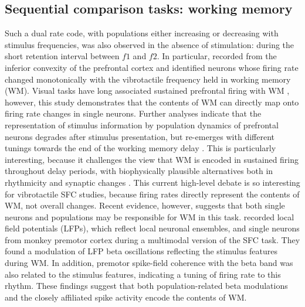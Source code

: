 \subsection{Sequential comparison tasks: working memory}
Such a dual rate code, with populations either increasing or decreasing with stimulus frequencies, was also observed in the absence of stimulation: during the short retention interval between $f1$ and $f2$. In particular, \textcite{Romo1999} recorded from the inferior convexity of the prefrontal cortex and identified neurons whose firing rate changed monotonically with the vibrotactile frequency held in working memory (WM). Visual tasks have long associated sustained prefrontal firing with WM \parencite{Funahashi1989,Fuster1971,Goldman-Rakic1995}, however, this study demonstrates that the contents of WM can directly map onto firing rate changes in single neurons. Further analyses indicate that the representation of stimulus information by population dynamics of prefrontal neurons degrades after stimulus presentation, but re-emerges with different tunings towards the end of the working memory delay \parencite{Barak2010}. This is particularly interesting, because it challenges the view that WM is encoded in sustained firing throughout delay periods, with biophysically plausible alternatives both in rhythmicity \parencite{Fiebig2017,Lundqvist2018a,Lundqvist2016} and synaptic changes \parencite{Mongillo2008,Stokes2015}. This current high-level debate \parencite[for either side, see:][]{Constantinidis2018,Lundqvist2018} is so interesting for vibrotactile SFC studies, because firing rates directly represent the contents of WM, not overall changes. Recent evidence, however, suggests that both single neurons and populations may be responsible for WM in this task. \textcite{Haegens2017} recorded local field potentials (LFPs), which reflect local neuronal ensembles, and single neurons from monkey premotor cortex during a multimodal version of the SFC task. They found a modulation of LFP beta oscillations reflecting the stimulus features during WM. In addition, premotor spike-field coherence with the beta band was also related to the stimulus features, indicating a tuning of firing rate to this rhythm. These findings suggest that both population-related beta modulations and the closely affiliated spike activity encode the contents of WM.


